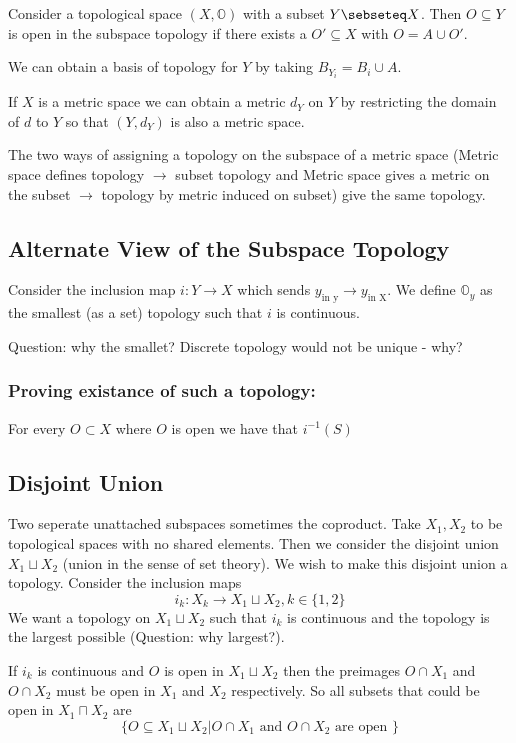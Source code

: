 \documentclass{homework}
\newcommand{\OO}{\mathbb{O}}
\begin{document}
Consider a topological space $(X, \OO)$ with a subset $Y \sebseteq X$. Then $O \subseteq Y$ is open in the subspace topology if there exists a $O' \subseteq X$ with $O = A \cup O'$.

We can obtain a basis of topology for $Y$ by taking $B_{Y_i} = B_i \cup A.$

If $X$ is a metric space we can obtain a metric $d_Y$ on $Y$ by restricting the domain of $d$ to $Y$  so that $(Y,d_Y)$ is also a metric space.

The two ways of assigning a topology on the subspace of a metric space (Metric space defines topology $\rightarrow$ subset topology and Metric space gives a metric on the subset $\rightarrow$ topology by metric induced on subset) give the same topology.




\subsection{Alternate View of the Subspace Topology}

Consider the inclusion map $i: Y \rightarrow X$ which sends $y_{\text{in y}} \rightarrow y_{\text{in X}}$. We define $\OO_y$ as the smallest (as a set) topology such that $i$ is continuous. 

Question: why the smallet? Discrete topology would not be unique - why?

\subsubsection{Proving existance of such a topology:}
For every $O \subset X$ where $O$ is open we have that $i^{-1}(S)$


\subsection{Disjoint Union}
Two seperate unattached subspaces sometimes the coproduct.
Take $X_1,X_2$ to be topological spaces with no shared elements. Then we consider the disjoint union $X_1 \sqcup X_2$ (union in the sense of set theory). We wish to make this disjoint union a topology. Consider the inclusion maps
\[i_k : X_k \rightarrow X_1 \sqcup X_2, k \in \{1,2\}\]
We want a topology on $X_1 \sqcup X_2$ such that $i_k$ is continuous and the topology is the largest possible (Question: why largest?).

If $i_k$ is continuous and $O$ is open in $X_1 \sqcup X_2$ then the preimages $O \cap X_1$ and $O \cap X_2$ must be open in $X_1$ and $X_2$ respectively. So all subsets that could be open in $X_1 \sqcap X_2$ are
\[\{O \subseteq X_1 \sqcup X_2 |O \cap X_1 \text{ and } O \cap X_2 \text{ are open }\}\]
\end{document}
